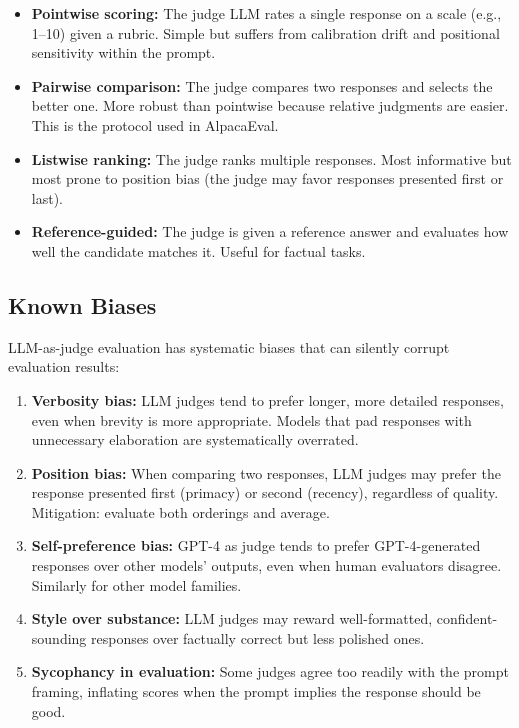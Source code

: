 \begin{itemize}
    \item \textbf{Pointwise scoring:} The judge LLM rates a single response on a
          scale (e.g., 1--10) given a rubric.  Simple but suffers from
          calibration drift and positional sensitivity within the prompt.
    \item \textbf{Pairwise comparison:} The judge compares two responses and
          selects the better one.  More robust than pointwise because relative
          judgments are easier.  This is the protocol used in AlpacaEval.
    \item \textbf{Listwise ranking:} The judge ranks multiple responses.  Most
          informative but most prone to position bias (the judge may favor
          responses presented first or last).
    \item \textbf{Reference-guided:} The judge is given a reference answer and
          evaluates how well the candidate matches it.  Useful for factual tasks.
\end{itemize}

\subsection{Known Biases}

\begin{warningbox}
LLM-as-judge evaluation has systematic biases that can silently corrupt evaluation
results:
\begin{enumerate}[label=(\arabic*)]
    \item \textbf{Verbosity bias:} LLM judges tend to prefer longer, more detailed
          responses, even when brevity is more appropriate.  Models that pad
          responses with unnecessary elaboration are systematically overrated.
    \item \textbf{Position bias:} When comparing two responses, LLM judges may
          prefer the response presented first (primacy) or second (recency),
          regardless of quality.  Mitigation: evaluate both orderings and average.
    \item \textbf{Self-preference bias:} GPT-4 as judge tends to prefer
          GPT-4-generated responses over other models' outputs, even when human
          evaluators disagree.  Similarly for other model families.
    \item \textbf{Style over substance:} LLM judges may reward well-formatted,
          confident-sounding responses over factually correct but less polished
          ones.
    \item \textbf{Sycophancy in evaluation:} Some judges agree too readily with
          the prompt framing, inflating scores when the prompt implies the
          response should be good.
\end{enumerate}
\end{warningbox}

